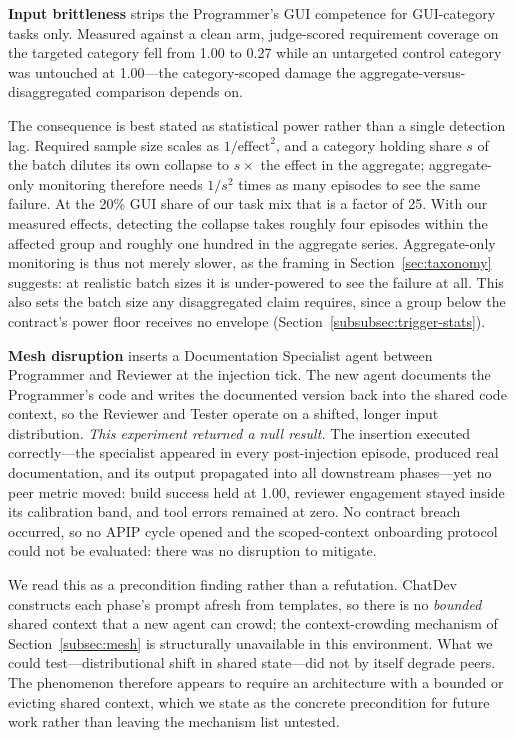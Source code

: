 \documentclass[conference]{IEEEtran}
\begin{document}
\textbf{Input brittleness} strips the Programmer's GUI competence for
GUI-category tasks only. Measured against a clean arm, judge-scored
requirement coverage on the targeted category fell from 1.00 to 0.27 while an
untargeted control category was untouched at 1.00---the category-scoped damage
the aggregate-versus-disaggregated comparison depends on.

The consequence is best stated as statistical power rather than a single
detection lag. Required sample size scales as $1/\text{effect}^2$, and a
category holding share $s$ of the batch dilutes its own collapse to $s\times$
the effect in the aggregate; aggregate-only monitoring therefore needs
$1/s^{2}$ times as many episodes to see the same failure. At the 20\% GUI
share of our task mix that is a factor of 25. With our measured effects,
detecting the collapse takes roughly four episodes within the affected group
and roughly one hundred in the aggregate series. Aggregate-only monitoring is
thus not merely slower, as the framing in Section~\ref{sec:taxonomy}
suggests: at realistic batch sizes it is under-powered to see the failure at
all. This also sets the batch size any disaggregated claim requires, since a
group below the contract's power floor receives no envelope
(Section~\ref{subsubsec:trigger-stats}).

\textbf{Mesh disruption} inserts a Documentation Specialist agent between
Programmer and Reviewer at the injection tick. The new agent documents the
Programmer's code and writes the documented version back into the shared code
context, so the Reviewer and Tester operate on a shifted, longer input
distribution. \emph{This experiment returned a null result.} The insertion
executed correctly---the specialist appeared in every post-injection episode,
produced real documentation, and its output propagated into all downstream
phases---yet no peer metric moved: build success held at 1.00, reviewer
engagement stayed inside its calibration band, and tool errors remained at
zero. No contract breach occurred, so no APIP cycle opened and the
scoped-context onboarding protocol could not be evaluated: there was no
disruption to mitigate.

We read this as a precondition finding rather than a refutation. ChatDev
constructs each phase's prompt afresh from templates, so there is no
\emph{bounded} shared context that a new agent can crowd; the
context-crowding mechanism of Section~\ref{subsec:mesh} is structurally
unavailable in this environment. What we could test---distributional shift in
shared state---did not by itself degrade peers. The phenomenon therefore
appears to require an architecture with a bounded or evicting shared context,
which we state as the concrete precondition for future work rather than
leaving the mechanism list untested.
\end{document}
